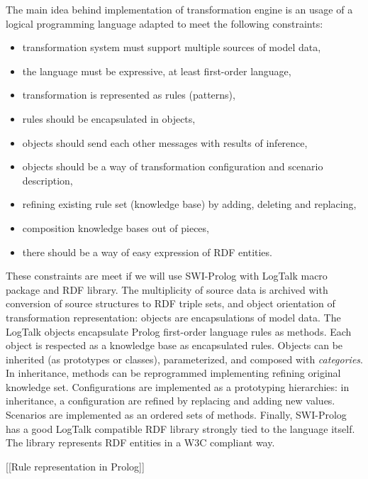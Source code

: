 \documentclass[12pt,a4paper]{llncs}
\begin{document}
The main idea behind implementation of transformation engine is an usage of a logical programming language adapted to meet the following constraints:
\begin{itemize}
\item transformation system must support multiple sources of model data,
\item the language must be expressive, at least first-order language,
\item transformation is represented as rules (patterns),
\item rules should be encapsulated in objects,
\item objects should send each other messages with results of inference,
\item objects should be a way of transformation configuration and scenario description,
\item refining existing rule set (knowledge base) by adding, deleting and replacing,
\item composition knowledge bases out of pieces,
\item there should be a way of easy expression of RDF entities.
\end{itemize}

These constraints are meet if we will use SWI-Prolog with LogTalk macro package and RDF library.  The multiplicity of source data is archived with conversion of source structures to RDF triple sets, and object orientation of transformation representation: objects are encapsulations of model data.  The LogTalk objects encapsulate Prolog first-order language rules as methods.  Each object is respected as a knowledge base as encapsulated rules.  Objects can be inherited (as prototypes or classes), parameterized, and composed with \emph{categories}.  In inheritance, methods can be reprogrammed implementing refining original knowledge set.  Configurations are implemented as a prototyping hierarchies: in inheritance, a configuration are refined by replacing and adding new values.  Scenarios are implemented as an ordered sets of methods.  Finally, SWI-Prolog has a good LogTalk compatible RDF library strongly tied to the language itself.  The library represents RDF entities in a W3C compliant way.

[[Rule representation in Prolog]]

\end{document}
